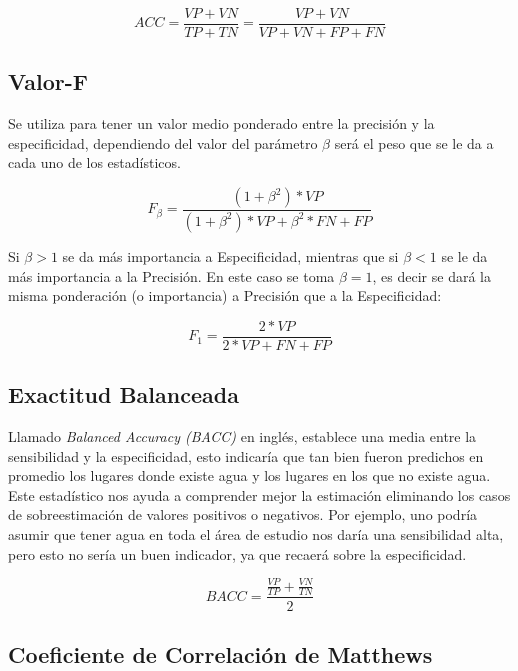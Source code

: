 \documentclass[10pt,a4paper, twoside]{report}
\begin{document}
\begin{equation}
ACC=\frac{VP+VN}{TP+TN}=\frac{VP+VN}{VP+VN+FP+FN}
\end{equation}

\subsection{Valor-F}
    
Se utiliza para tener un valor medio ponderado entre la precisión y la especificidad, dependiendo del  valor del parámetro $\beta$ será el peso que se le da a cada uno de los estadísticos.

\begin{equation}
F_{\beta}=\frac{(1+\beta^{2})*VP}{(1+\beta^{2})*VP + \beta^{2}*FN + FP }
\end{equation}

Si $\beta > 1$ se da más importancia a Especificidad, mientras que si $\beta < 1$ se le da más importancia a la Precisión. 
En este caso se toma $\beta = 1$, es decir se dará la misma ponderación (o importancia) a Precisión que a la Especificidad:

\begin{equation}
F_{1}=\frac{2*VP}{2 * VP + FN + FP }
\end{equation}

\subsection{Exactitud Balanceada}

Llamado\textit{ Balanced Accuracy (BACC)} en inglés, establece una media entre la sensibilidad y la especificidad, esto indicaría que tan bien fueron predichos en promedio los lugares donde existe agua y los lugares en los que no existe agua. Este estadístico nos ayuda a comprender mejor la estimación eliminando los casos de sobreestimación de valores positivos o negativos. Por ejemplo, uno podría asumir que tener agua en toda el área de estudio nos daría una sensibilidad alta, pero esto no sería un buen indicador, ya que recaerá sobre la especificidad.

\begin{equation}
BACC=\frac{\frac{VP}{TP}+\frac{VN}{TN}}{2}
\end{equation}


\subsection{Coeficiente de Correlación de Matthews}
\label{defMatthews}
\end{document}
